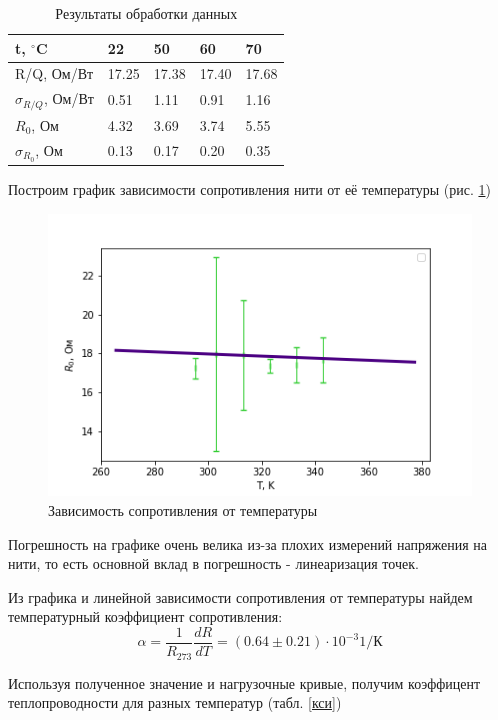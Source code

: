 \documentclass[a4paper,12pt]{article} %
\begin{document}
\begin{table}[h!]
\caption{Результаты обработки данных}
\label{обработка}
\begin{tabular}{|l|l|l|l|l|}
\hline
t, $^\circ$C & 22    & 50    & 60    & 70    \\ \hline
R/Q, Ом/Вт   & 17.25 & 17.38 & 17.40 & 17.68 \\ \hline
$\sigma_{R/Q}$, Ом/Вт  & 0.51  & 1.11  & 0.91  & 1.16  \\ \hline
$R_0$, Ом  & 4.32  & 3.69  & 3.74  & 5.55  \\ \hline
$\sigma_{R_0}$, Ом & 0.13  & 0.17  & 0.20  & 0.35  \\ \hline
\end{tabular}
\end{table}

Построим график зависимости сопротивления нити от её температуры (рис. \ref{R(T)})
\begin{figure}[h!]
\begin{center}
\includegraphics[width=\textwidth]{R(T)}\end{center}
\caption{Зависимость сопротивления от температуры} \label{R(T)}
\end{figure}
Погрешность на графике очень велика из-за плохих измерений напряжения на нити, то есть основной вклад в погрешность - линеаризация точек.

Из графика и линейной зависимости сопротивления от температуры найдем температурный коэффициент сопротивления:
\begin{equation}
\alpha=\frac{1}{R_{273}}\frac{dR}{dT}=(0.64 \pm 0.21)\cdot 10^{-3}  1/К
\end{equation}

Используя полученное значение и нагрузочные кривые, получим коэффицент теплопроводности для разных температур (табл. \ref{кси})
\end{document}
